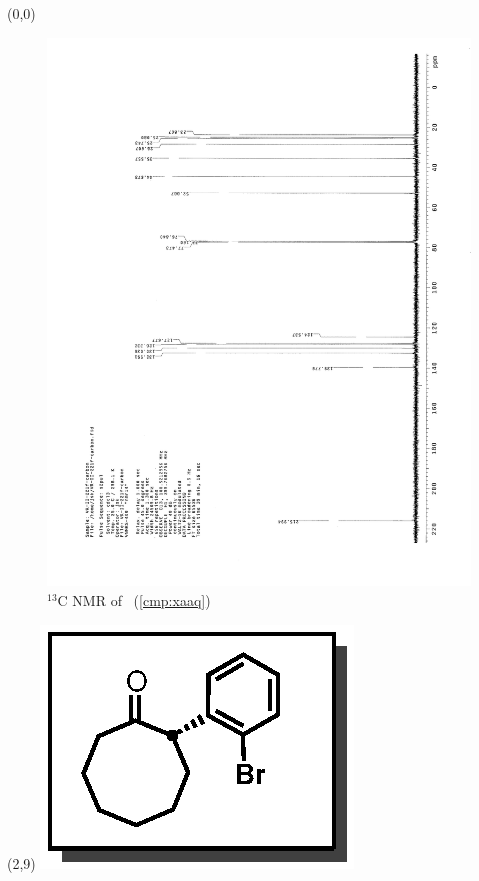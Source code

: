 \clearpage
\begin{textblock}{20}(0,0)
\begin{figure}[htb]
\caption{$^{13}$C NMR of  \CMPxaaq\ (\ref{cmp:xaaq})}
\includegraphics[scale=0.75, trim = 0mm 0mm 0mm 5mm,
clip]{chp_asymmetric/images/nmr/xaaqC}
\vspace{-100pt}
\end{figure}
\end{textblock}
\begin{textblock}{1}(2,9)
\includegraphics[scale=0.8, angle=90]{chp_asymmetric/images/xaaq}
\end{textblock}
\clearpage

